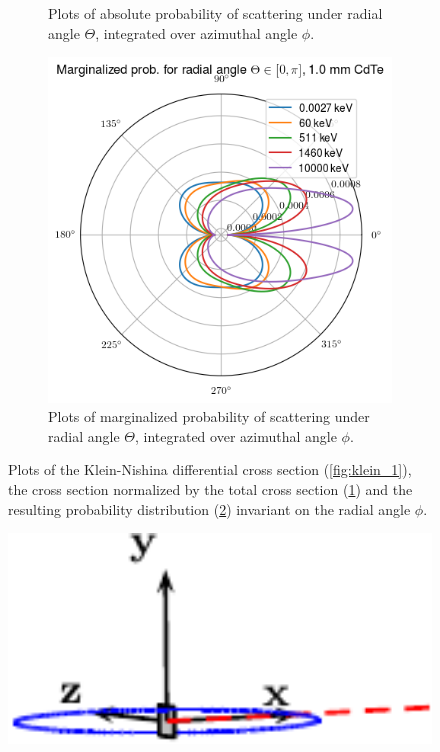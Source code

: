 \documentclass[a4paper,12pt,titlepage, twoside]{article}
\begin{document}
\begin{figure}
\begin{subfigure}{0.48\textwidth}
    \caption{Plots of absolute probability of scattering under radial angle $\Theta$, integrated over azimuthal angle $\phi$.}
    \label{fig:klein_2}
  \end{subfigure}
  \begin{subfigure}{0.48\textwidth}
    \includegraphics[width=1.0\textwidth]{./fig/klein_nishina_3.png}
  \caption{Plots of marginalized probability of scattering under radial angle $\Theta$, integrated over azimuthal angle $\phi$.}
    \label{fig:klein_3}
  \end{subfigure}
  \caption{Plots of the Klein-Nishina differential cross section (\ref{fig:klein_1}), the cross section normalized by the total cross section (\ref{fig:klein_2}) and the resulting probability distribution (\ref{fig:klein_3}) invariant on the radial angle $\phi$.}
  \label{fig:klein_nishina}
\end{figure}

\begin{figure}
\centering
\includegraphics[width=1.0\textwidth]{./fig/compton_scattering_illustration.pdf}
\end{figure}
\end{document}
